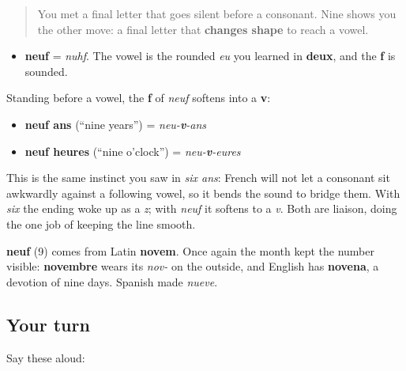 \label{lesson:FR-C06-neuf}



\begin{quote}
You met a final letter that goes silent before a consonant. Nine shows you the other move: a final letter that \textbf{changes shape} to reach a vowel.
\end{quote}

\begin{sounds}
\begin{itemize}
\raggedright
  \item \textbf{neuf} = \emph{nuhf}. The vowel is the rounded \emph{eu} you learned in \textbf{deux}, and the \textbf{f} is sounded.
\end{itemize}
\end{sounds}

\begin{grammarlens}[title={Grammar Lens: the f that turns into a v}]
Standing before a vowel, the \textbf{f} of \emph{neuf} softens into a \textbf{v}:

\begin{itemize}
\raggedright
  \item \textbf{neuf ans} (\textquotedblleft{}nine years\textquotedblright{}) = \emph{neu-\textbf{v}-ans}
  \item \textbf{neuf heures} (\textquotedblleft{}nine o'clock\textquotedblright{}) = \emph{neu-\textbf{v}-eures}
\end{itemize}

This is the same instinct you saw in \emph{six ans}: French will not let a consonant sit awkwardly against a following vowel, so it bends the sound to bridge them. With \emph{six} the ending woke up as a \emph{z}; with \emph{neuf} it softens to a \emph{v}. Both are liaison, doing the one job of keeping the line smooth.
\end{grammarlens}

\begin{cousinweb}
\textbf{neuf} (9) comes from Latin \textbf{novem}. Once again the month kept the number visible: \textbf{novembre} wears its \emph{nov-} on the outside, and English has \textbf{novena}, a devotion of nine days. Spanish made \emph{nueve}.
\end{cousinweb}

\subsection*{Your turn}
Say these aloud:

